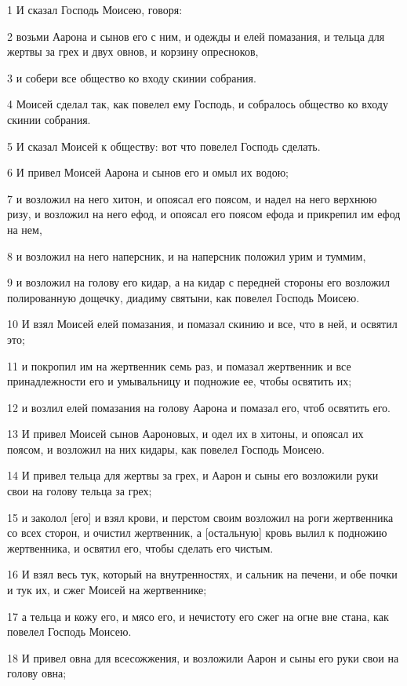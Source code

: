 \par 1 И сказал Господь Моисею, говоря:
\par 2 возьми Аарона и сынов его с ним, и одежды и елей помазания, и тельца для жертвы за грех и двух овнов, и корзину опресноков,
\par 3 и собери все общество ко входу скинии собрания.
\par 4 Моисей сделал так, как повелел ему Господь, и собралось общество ко входу скинии собрания.
\par 5 И сказал Моисей к обществу: вот что повелел Господь сделать.
\par 6 И привел Моисей Аарона и сынов его и омыл их водою;
\par 7 и возложил на него хитон, и опоясал его поясом, и надел на него верхнюю ризу, и возложил на него ефод, и опоясал его поясом ефода и прикрепил им ефод на нем,
\par 8 и возложил на него наперсник, и на наперсник положил урим и туммим,
\par 9 и возложил на голову его кидар, а на кидар с передней стороны его возложил полированную дощечку, диадиму святыни, как повелел Господь Моисею.
\par 10 И взял Моисей елей помазания, и помазал скинию и все, что в ней, и освятил это;
\par 11 и покропил им на жертвенник семь раз, и помазал жертвенник и все принадлежности его и умывальницу и подножие ее, чтобы освятить их;
\par 12 и возлил елей помазания на голову Аарона и помазал его, чтоб освятить его.
\par 13 И привел Моисей сынов Аароновых, и одел их в хитоны, и опоясал их поясом, и возложил на них кидары, как повелел Господь Моисею.
\par 14 И привел тельца для жертвы за грех, и Аарон и сыны его возложили руки свои на голову тельца за грех;
\par 15 и заколол [его] и взял крови, и перстом своим возложил на роги жертвенника со всех сторон, и очистил жертвенник, а [остальную] кровь вылил к подножию жертвенника, и освятил его, чтобы сделать его чистым.
\par 16 И взял весь тук, который на внутренностях, и сальник на печени, и обе почки и тук их, и сжег Моисей на жертвеннике;
\par 17 а тельца и кожу его, и мясо его, и нечистоту его сжег на огне вне стана, как повелел Господь Моисею.
\par 18 И привел овна для всесожжения, и возложили Аарон и сыны его руки свои на голову овна;
